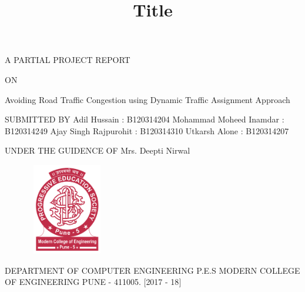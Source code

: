 \documentclass[12pt,a4paper,final]{report}
\title{Title}
\begin{document}
\begin{center}
\thispagestyle{empty}
\vspace*{1cm}
A PARTIAL PROJECT REPORT
\vspace*{0.75cm}

ON
\vspace*{0.75cm}

\Large
Avoiding Road Traffic Congestion using Dynamic Traffic Assignment Approach
\vspace*{0.75cm}


\vspace*{0.5cm}
SUBMITTED BY
\vspace*{0.35cm}
\linebreak
Adil Hussain : B120314204
\linebreak
Mohammad Moheed Inamdar : B120314249
\linebreak
Ajay Singh Rajpurohit : B120314310
\linebreak
Utkarsh Alone : B120314207
\linebreak

\vspace*{0.5cm}
UNDER THE GUIDENCE OF
\vspace*{0.35cm}
\linebreak
Mrs. Deepti Nirwal
\vspace*{0.3cm}
\normalsize
\begin{figure}[h]
\begin{center}
\includegraphics[width=3.5cm, height=4.0cm]{logo.png}
\end{center}
\end{figure}



\large
\vspace*{0.3cm}
DEPARTMENT OF COMPUTER ENGINEERING
\linebreak
P.E.S MODERN COLLEGE OF ENGINEERING
\linebreak
PUNE - 411005.
\linebreak
$[$2017 - 18$]$ 
\end{center}
\newpage
\end{document}
